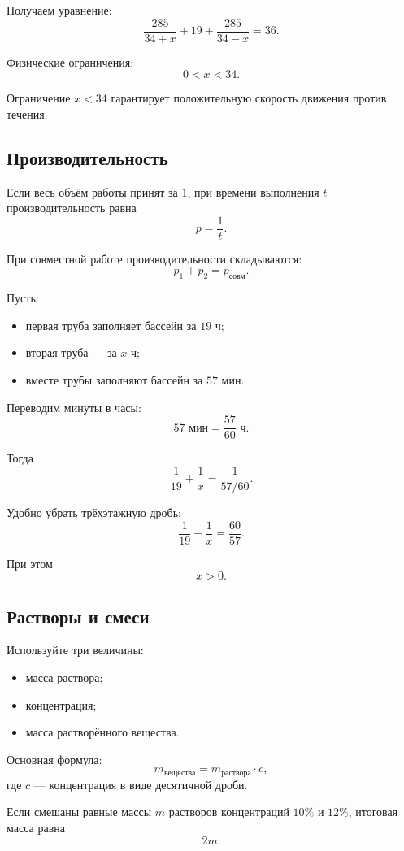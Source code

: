 \documentclass[a4paper,12pt]{article}
\begin{document}
Получаем уравнение:
\[
\frac{285}{34+x}
+
19
+
\frac{285}{34-x}
=
36.
\]

Физические ограничения:
\[
0<x<34.
\]

Ограничение \(x<34\) гарантирует положительную скорость движения
против течения.

\subsection*{Производительность}

Если весь объём работы принят за \(1\), при времени выполнения \(t\)
производительность равна
\[
p=\frac1t.
\]

При совместной работе производительности складываются:
\[
p_1+p_2=p_{\text{совм}}.
\]

Пусть:

\begin{itemize}
  \item первая труба заполняет бассейн за \(19\) ч;
  \item вторая труба --- за \(x\) ч;
  \item вместе трубы заполняют бассейн за \(57\) мин.
\end{itemize}

Переводим минуты в часы:
\[
57\text{ мин}=\frac{57}{60}\text{ ч}.
\]

Тогда
\[
\frac1{19}
+
\frac1x
=
\frac1{57/60}.
\]

Удобно убрать трёхэтажную дробь:
\[
\frac1{19}
+
\frac1x
=
\frac{60}{57}.
\]

При этом
\[
x>0.
\]

\subsection*{Растворы и смеси}

Используйте три величины:

\begin{itemize}
  \item масса раствора;
  \item концентрация;
  \item масса растворённого вещества.
\end{itemize}

Основная формула:
\[
m_{\text{вещества}}
=
m_{\text{раствора}}\cdot c,
\]
где \(c\) --- концентрация в виде десятичной дроби.

Если смешаны равные массы \(m\) растворов концентраций \(10\%\)
и \(12\%\), итоговая масса равна
\[
2m.
\]
\end{document}
